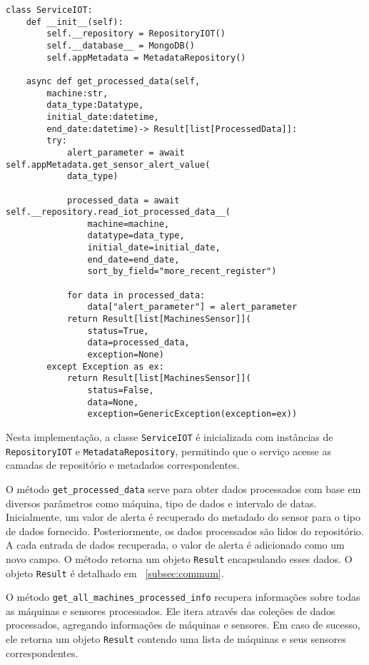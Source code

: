 \begin{verbatim}
class ServiceIOT:
    def __init__(self):
        self.__repository = RepositoryIOT()
        self.__database__ = MongoDB()
        self.appMetadata = MetadataRepository()
            
    async def get_processed_data(self,
        machine:str,
        data_type:Datatype,
        initial_date:datetime,
        end_date:datetime)-> Result[list[ProcessedData]]:
        try:
            alert_parameter = await self.appMetadata.get_sensor_alert_value(
            data_type)

            processed_data = await self.__repository.read_iot_processed_data__(
                machine=machine,
                datatype=data_type,
                initial_date=initial_date,
                end_date=end_date,
                sort_by_field="more_recent_register")
            
            for data in processed_data:
                data["alert_parameter"] = alert_parameter
            return Result[list[MachinesSensor]](
                status=True,
                data=processed_data,
                exception=None)
        except Exception as ex:
            return Result[list[MachinesSensor]](
                status=False,
                data=None,
                exception=GenericException(exception=ex))
\end{verbatim}

Nesta implementação, a classe \texttt{ServiceIOT} é inicializada com instâncias de \texttt{RepositoryIOT} e \texttt{MetadataRepository}, permitindo que o serviço acesse as camadas de repositório e metadados correspondentes.

O método \texttt{get\_processed\_data} serve para obter dados processados com base em diversos parâmetros como máquina, tipo de dados e intervalo de datas. Inicialmente, um valor de alerta é recuperado do metadado do sensor para o tipo de dados fornecido. Posteriormente, os dados processados são lidos do repositório. A cada entrada de dados recuperada, o valor de alerta é adicionado como um novo campo. O método retorna um objeto \texttt{Result} encapsulando esses dados. O objeto \texttt{Result} é detalhado em ~\ref{subsec:commum}.

O método \texttt{get\_all\_machines\_processed\_info} recupera informações sobre todas as máquinas e sensores processados. Ele itera através das coleções de dados processados, agregando informações de máquinas e sensores. Em caso de sucesso, ele retorna um objeto \texttt{Result} contendo uma lista de máquinas e seus sensores correspondentes.

